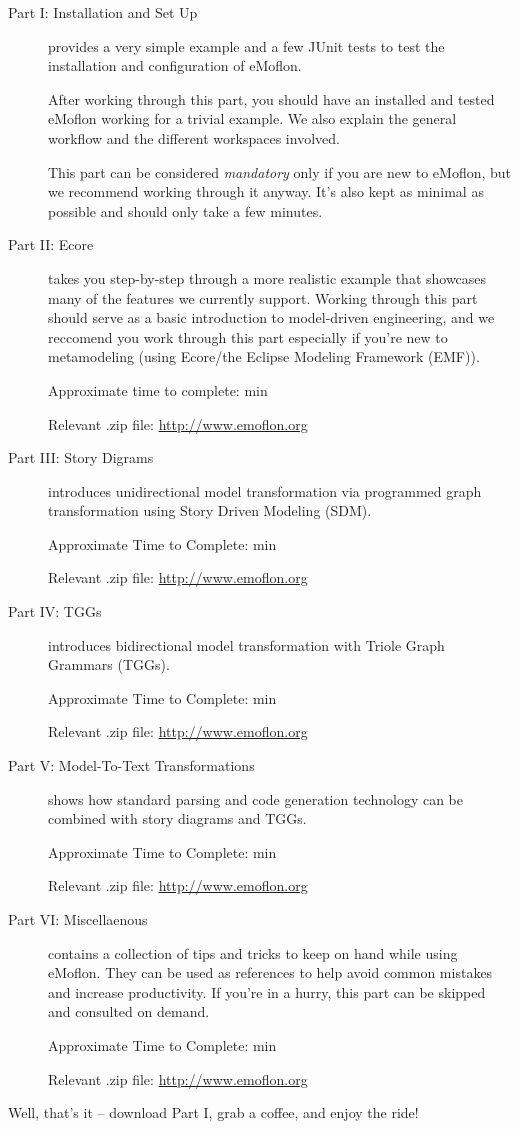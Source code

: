 \begin{description}

\item[Part I: Installation and Set Up] provides a very simple example and a few JUnit tests to test the installation and configuration of eMoflon.
 
After working through this part, you should have an installed and tested eMoflon working for a trivial example.
We also explain the general workflow and the different workspaces involved.

This part can be considered \emph{mandatory} only if you are new to eMoflon, but we recommend working through it anyway.
It's also kept as minimal as possible and should only take a few minutes.

\vspace{0.5cm}

\item[Part II: Ecore] takes you step-by-step through a more realistic example that showcases many of the features we currently support.
Working through this part should serve as a basic introduction to model-driven engineering, and we reccomend you work through this part especially if you're new to metamodeling (using Ecore/the Eclipse Modeling Framework (EMF)).

{\small Approximate time to complete: min

Relevant .zip file: \url{http://www.emoflon.org} }

\item[Part III: Story Digrams] introduces unidirectional model transformation via programmed graph transformation using Story Driven Modeling (SDM).

{\small Approximate Time to Complete: min

Relevant .zip file: \url{http://www.emoflon.org} }

\item[Part IV: TGGs] introduces bidirectional model transformation with Triole Graph Grammars (TGGs).

{\small Approximate Time to Complete: min

Relevant .zip file: \url{http://www.emoflon.org} }

\item[Part V: Model-To-Text Transformations] shows how standard parsing and code generation technology can be combined with story diagrams and TGGs.

{\small Approximate Time to Complete: min

Relevant .zip file: \url{http://www.emoflon.org} }

\item[Part VI: Miscellaenous] contains a collection of tips and tricks to keep on hand while using eMoflon. They can be used as references to help avoid common mistakes and increase productivity. If you're in a hurry, this part can be skipped and consulted on demand.

{\small Approximate Time to Complete: min

Relevant .zip file: \url{http://www.emoflon.org} }

\end{description}

Well, that's it -- download Part I, grab a coffee, and enjoy the ride!

